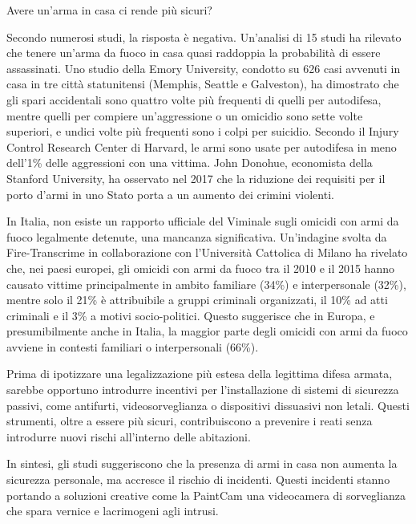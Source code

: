 \documentclass[12pt]{book} %
\begin{document}
\begin{mdframed}[linewidth=1pt]
Avere un'arma in casa ci rende più sicuri?

Secondo numerosi studi, la risposta è negativa. Un'analisi di 15 studi ha rilevato che tenere un'arma da fuoco in casa quasi raddoppia la probabilità di essere assassinati. Uno studio della Emory University, condotto su 626 casi avvenuti in casa in tre città statunitensi (Memphis, Seattle e Galveston), ha dimostrato che gli spari accidentali sono quattro volte più frequenti di quelli per autodifesa, mentre quelli per compiere un'aggressione o un omicidio sono sette volte superiori, e undici volte più frequenti sono i colpi per suicidio. Secondo il Injury Control Research Center di Harvard, le armi sono usate per autodifesa in meno dell'1\% delle aggressioni con una vittima. John Donohue, economista della Stanford University, ha osservato nel 2017 che la riduzione dei requisiti per il porto d'armi in uno Stato porta a un aumento dei crimini violenti.

In Italia, non esiste un rapporto ufficiale del Viminale sugli omicidi con armi da fuoco legalmente detenute, una mancanza significativa. Un’indagine svolta da Fire-Transcrime in collaborazione con l'Università Cattolica di Milano ha rivelato che, nei paesi europei, gli omicidi con armi da fuoco tra il 2010 e il 2015 hanno causato vittime principalmente in ambito familiare (34\%) e interpersonale (32\%), mentre solo il 21\% è attribuibile a gruppi criminali organizzati, il 10\% ad atti criminali e il 3\% a motivi socio-politici. Questo suggerisce che in Europa, e presumibilmente anche in Italia, la maggior parte degli omicidi con armi da fuoco avviene in contesti familiari o interpersonali (66\%).

Prima di ipotizzare una legalizzazione più estesa della legittima difesa armata, sarebbe opportuno introdurre incentivi per l'installazione di sistemi di sicurezza passivi, come antifurti, videosorveglianza o dispositivi dissuasivi non letali. Questi strumenti, oltre a essere più sicuri, contribuiscono a prevenire i reati senza introdurre nuovi rischi all'interno delle abitazioni.

In sintesi, gli studi suggeriscono che la presenza di armi in casa non aumenta la sicurezza personale, ma accresce il rischio di incidenti. Questi incidenti stanno portando a soluzioni creative come la PaintCam una videocamera di sorveglianza che spara vernice e lacrimogeni agli intrusi.
\end{mdframed}
\end{document}
